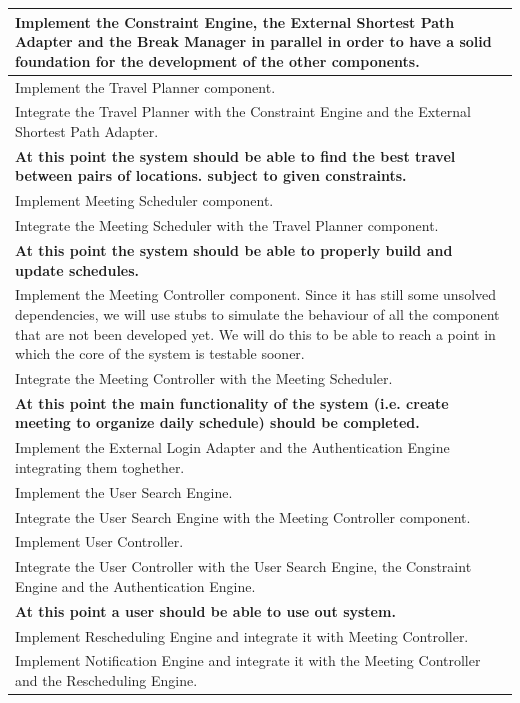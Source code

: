 \begin{longtable}{|m{16cm}|}
	\hline Implement the Constraint Engine, the External Shortest Path Adapter and the Break Manager in parallel in order to have a solid foundation for the development of the other components.
	\\ \hline Implement the Travel Planner component.
	\\ \hline Integrate the Travel Planner with the Constraint Engine and the External Shortest Path Adapter.
	\\ \hline
	\textbf{At this point the system should be able to find the best travel between pairs of locations. subject to given constraints.}
	\\ \hline Implement Meeting Scheduler component. 
	\\ \hline Integrate the Meeting Scheduler with the Travel Planner component.
	\\ \hline
	\textbf{At this point the system should be able to properly build and update schedules.}
	\\ \hline Implement the Meeting Controller component. Since it has still some unsolved dependencies, we will use stubs to simulate the behaviour of all the component that are not been developed yet. We will do this to be able to reach a point in which the core of the system is testable sooner.
	\\ \hline Integrate the Meeting Controller with the Meeting Scheduler.
	\\ \hline
	\textbf{At this point the main functionality of the system (i.e. create meeting to organize daily schedule) should be completed.}
	\\ \hline Implement the External Login Adapter and the Authentication Engine integrating them toghether.
	\\ \hline Implement the User Search Engine.
	\\ \hline Integrate the User Search Engine with the Meeting Controller component.
	\\ \hline Implement User Controller.
	\\ \hline Integrate the User Controller with the User Search Engine, the Constraint Engine and the Authentication Engine.
	\\ \hline
	\textbf{At this point a user should be able to use out system.}
	\\ \hline Implement Rescheduling Engine and integrate it with Meeting Controller.
	\\ \hline Implement Notification Engine and integrate it with the Meeting Controller and the Rescheduling Engine.

\end{longtable}
